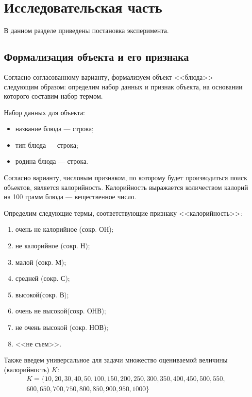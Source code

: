 \chapter{Исследовательская часть}

В данном разделе приведены постановка эксперимента. 

\section{Формализация объекта и его признака}\label{formal}

Согласно согласованному варианту, формализуем объект <<блюда>> следующим образом: 
определим набор данных и признак объекта, на основании которого составим набор термом.

Набор данных для объекта:
\begin{itemize}
	\item название блюда --- строка;
	\item тип блюда --- строка;
	\item родина блюда --- строка.
\end{itemize}

Согласно варианту, числовым признаком, по которому будет производиться поиск объектов, является калорийность. 
Калорийность выражается количеством калорий на 100 грамм блюда --- вещественное число. 

Определим следующие термы, соответствующие признаку <<калорийность>>:
\begin{enumerate}
	\item очень не калорийное (сокр. ОН);
	\item не калорийное (сокр. Н);
	\item малой (сокр. М);
	\item средней (сокр. С);
	\item высокой(сокр. В);
	\item очень не высокой(сокр. ОНВ);
	\item не очень высокой (сокр. НОВ);
	\item <<не съем>>.
\end{enumerate}	

\clearpage

Также введем универсальное для задачи множество оцениваемой величины (калорийность) $K$:
\begin{equation}
	\label{eq:k}
	\begin{aligned}
	K = \{10, 20, 30, 40, 50, 100, 150, 200, 250, 300, 350, 400, 450, 500, 550, \\ 600, 650, 700, 750, 800, 850, 900, 950, 1000\}
	\end{aligned}
\end{equation}

